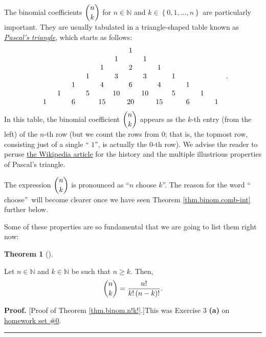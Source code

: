 \documentclass[numbers=enddot,12pt,final,onecolumn,notitlepage]{scrartcl}%
\numberwithin{exer}{subsection}
\theoremstyle{definition}
\newtheorem{theo}{Theorem}[subsection]
\newenvironment{theorem}[1][]
{\begin{theo}[#1]\begin{leftbar}}
{\end{leftbar}\end{theo}}
\newenvironment{proof}[1][Proof]{\noindent\textbf{#1.} }{\ \rule{0.5em}{0.5em}}
\begin{document}
The binomial coefficients $\dbinom{n}{k}$ for $n\in\mathbb{N}$ and
$k\in\left\{  0,1,\ldots,n\right\}  $ are particularly important. They are
usually tabulated in a triangle-shaped table known as
\textit{\href{https://en.wikipedia.org/wiki/Pascal's_triangle}{\textit{Pascal's
triangle}}}, which starts as follows:%
\[%
\begin{array}
[c]{ccccccccccccc}%
\phantom{15} & \phantom{15} & \phantom{15} & \phantom{15} & \phantom{15} &
\phantom{15} & 1 & \phantom{15} & \phantom{15} & \phantom{15} & \phantom{15} &
\phantom{15} & \phantom{15}\\
&  &  &  &  & 1 &  & 1 &  &  &  &  & \\
&  &  &  & 1 &  & 2 &  & 1 &  &  &  & \\
&  &  & 1 &  & 3 &  & 3 &  & 1 &  &  & \\
&  & 1 &  & 4 &  & 6 &  & 4 &  & 1 &  & \\
& 1 &  & 5 &  & 10 &  & 10 &  & 5 &  & 1 & \\
1 &  & 6 &  & 15 &  & 20 &  & 15 &  & 6 &  & 1
\end{array}
\ .
\]
In this table, the binomial coefficient $\dbinom{n}{k}$ appears as the $k$-th
entry (from the left) of the $n$-th row (but we count the rows from $0$; that
is, the topmost row, consisting just of a single \textquotedblleft%
$1$\textquotedblright, is actually the $0$-th row). We advise the reader to
peruse \href{https://en.wikipedia.org/wiki/Pascal's_triangle}{the Wikipedia
article} for the history and the multiple illustrious properties of Pascal's triangle.

The expression $\dbinom{n}{k}$ is pronounced as \textquotedblleft$n$ choose
$k$\textquotedblright. The reason for the word \textquotedblleft
choose\textquotedblright\ will become clearer once we have seen Theorem
\ref{thm.binom.comb-int} further below.

Some of these properties are so fundamental that we are going to list them
right now:

\begin{theorem}
\label{thm.binom.n!k!}Let $n\in\mathbb{N}$ and $k\in\mathbb{N}$ be such that
$n\geq k$. Then,%
\[
\dbinom{n}{k}=\dfrac{n!}{k!\left(  n-k\right)  !}.
\]

\end{theorem}

\begin{proof}
[Proof of Theorem \ref{thm.binom.n!k!}.]This was Exercise 3 \textbf{(a)} on
\href{http://www-users.math.umn.edu/~dgrinber/19s/hw0s.pdf}{homework set \#0}.
\end{proof}
\end{document}
